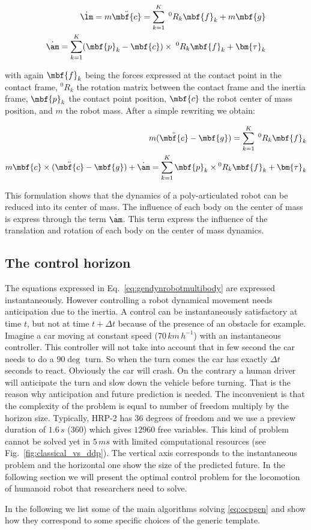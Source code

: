 \begin{align}
\dot{\bf \lm} = m \ddot{\mbf{c}} = \sum\limits_{k=1}^{K} \; {^0}R_k \mbf{f}_k + m \mbf{g}
\label{eq:linear:momentum}\\
\dot{\bf \am} = \sum\limits_{k=1}^{K} (\mbf{p}_k -\mbf{c}) \times \; {^0}R_k \mbf{f}_k  + \bm{\tau}_k
\label{eq:angular:momentum}
\end{align}

with again $\mbf{f}_k$ being the forces expressed at the contact point in the contact frame, ${^0}R_k$ the rotation matrix between the contact frame and the inertia frame, $\mbf{p}_k$ the contact point position, $\mbf{c}$ the robot center of mass position, and $m$ the robot mass.
After a simple rewriting we obtain:

\begin{align}
m (\ddot{\mbf{c}}-\mbf{g}) = \sum\limits_{k=1}^{K} \; {^0}R_k \mbf{f}_k
\label{eq:lineardyn}\\
m \mbf{c} \times (\ddot{\mbf{c}}-\mbf{g}) + \dot{\bf \am} = \sum\limits_{k=1}^{K} \mbf{p}_k \times {^0}R_k \mbf{f}_k  + \bm{\tau}_k
\label{eq:angulardyn}
\end{align}

This formulation shows that the dynamics of a poly-articulated robot can be reduced into its center of mass.
The influence of each body on the center of mass is express through the term $\dot{\bf \am}$.
This term express the influence of the translation and rotation of each body on the center of mass dynamics.

\subsection*{The control horizon}

The equations expressed in Eq.~\ref{eq:gendynrobotmultibody} are expressed instantaneously.
However controlling a robot dynamical movement needs anticipation due to the inertia.
A control can be instantaneously satisfactory at time $t$, but not at time $t+\Delta t$ because of the presence of an obstacle for example.
Imagine a car moving at constant speed ($70\,km\,h^{-1}$) with an instantaneous controller.
This controller will not take into account that in few second the car needs to do a $90\deg$ turn.
So when the turn comes the car has exactly $\Delta t$ seconds to react.
Obviously the car will crash.
On the contrary a human driver will anticipate the turn and slow down the vehicle before turning.
That is the reason why anticipation and future prediction is needed.
The inconvenient is that the complexity of the problem is equal to number of freedom  multiply by the horizon size.
Typically, HRP-2 has $36$ degrees of freedom and we use a preview duration of $1.6\,s$ ($360$) which gives $12960$ free variables.
This kind of problem cannot be solved yet in $5\,ms$ with limited computational resources
(see Fig.~\ref{fig:classical_vs_ddp}).
The vertical axis corresponds to the instantaneous problem and the horizontal one show the size of the predicted future.
In the following section we will present the optimal control problem for the locomotion of humanoid robot that researchers need to solve.

In the following we list some of the main algorithms solving \eqref{eq:ocpgen} and show how they correspond to some specific choices of the generic template.
